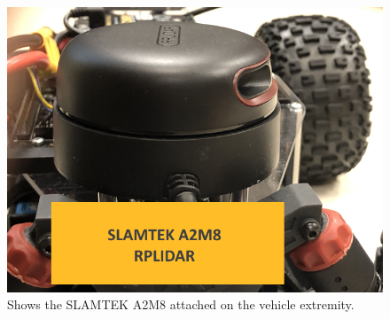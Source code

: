 \documentclass[conference]{IEEEtran}
\begin{document}

\begin{figure}
    \centering
    \includegraphics[scale=0.18]{lidar_diagram.png}
    \caption{Shows the SLAMTEK A2M8 attached on the vehicle extremity.}
    \label{Figure 3}
\end{figure}

\end{document}
